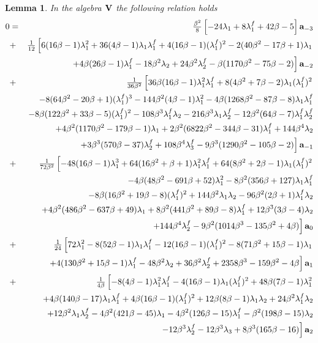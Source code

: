 \documentclass[a4paper]{amsart}
\newtheorem{lemma}{Lemma}[section]
\newcommand{\Vo}{{\bf V}}
\newcommand{\lmu}{\lambda_1}
\newcommand{\lmf}{\lambda_1^f}
\newcommand{\lmd}{\lambda_2}
\newcommand{\lmdf}{\lambda_2^f}
\newcommand{\lmt}{\lambda_3}
\newcommand{\bt}{\beta}
\newcommand{\ba}{{\bf a}}
\begin{document}
\begin{lemma}\label{rel23}
In the algebra $\Vo$ the following relation holds
\begin{eqnarray*}
0&=&\tfrac{\bt^2}{8}\left [-24\lmu+8\lmf+42\bt-5\right ] \ba_{-3} \\
&+&
\tfrac{1}{12}\left [6(16\bt-1)\lmu^2+36(4\bt-1)\lmu\lmf+4(16\bt-1)(\lmf)^2 -2(40\bt^2-17\bt+1)\lmu\right .\\
&& \left . +4\bt(26\bt-1)\lmf-18\bt^2\lmd+24\bt^2\lmdf -\bt(1170\bt^2-75\bt-2) \right ] \ba_{-2} \\
&+& \tfrac{1}{36\bt^2}\left [
36\bt(16\bt-1)\lmu^2\lmf+8(4\bt^2+7\bt-2)\lmu(\lmf)^2 \right . \\
&&-8(64\bt^2-20\bt+1)(\lmf)^3-144\bt^2(4\bt-1)\lmu^2-4\bt(1268\bt^2-87\bt-8)\lmu\lmf \\
&& -8\bt(122\bt^2+33\bt-5)(\lmf)^2-108\bt^3\lmf\lmd-216\bt^3\lmu\lmdf -12\bt^2(64\bt-7)\lmf\lmdf\\
&& +4\bt^2(1170\bt^2-179\bt-1)\lmu +2\bt^2(6822\bt^2-344\bt-31)\lmf +144\bt^4\lmd\\
&&  \left . +3\bt^3(570\bt-37)\lmdf +108\bt^4\lmt^f-9\bt^3(1290\bt^2-105\bt-2)\right ] \ba_{-1} \\
&+& \tfrac{1}{72\bt^2}\left [
-48(16\bt-1)\lmu^3+64(16\bt^2+\bt+1)\lmu^2\lmf+64(8\bt^2+2\bt-1)\lmu(\lmf)^2\right .\\
&& -4\bt(48\bt^2-691\bt+52)\lmu^2-8\bt^2(356\bt+127)\lmu\lmf \\
&& -8\bt(16\bt^2+19\bt-8)(\lmf)^2 
+144\bt^2\lmu\lmd-96\bt^2(2\bt+1)\lmf\lmd \\
&& +4\bt^2(486\bt^2-637\bt+49)\lmu 
 +8\bt^2(441\bt^2+89\bt-8)\lmf+12\bt^3(3\bt-4)\lmd\\
 &&\left .+144\bt^4\lmdf-9\bt^2(1014\bt^3-135\bt^2+4\bt) \right ] \ba_{0} \\
&+& \tfrac{1}{24}\left [
72\lmu^2-8(52\bt-1)\lmu\lmf-12(16\bt-1)(\lmf)^2-8(71\bt^2+15\bt-1)\lmu \right . \\
&&\left .+4(130\bt^2+15\bt-1)\lmf-48\bt^2\lmd+36\bt^2\lmdf+2358\bt^3-159\bt^2-4\bt \right ] \ba_{1} \\
&+& \tfrac{1}{4\bt}\left [
-8(4\bt-1)\lmu^2\lmf-4(16\bt-1)\lmu(\lmf)^2+48\bt(7\bt-1)\lmu^2 \right . \\
&& +4\bt(140\bt-17)\lmu\lmf+4\bt(16\bt-1)(\lmf)^2+12\bt(8\bt-1)\lmu\lmd+24\bt^2\lmf\lmd \\
&& +12\bt^2\lmu\lmdf -4\bt^2(421\bt-45)\lmu-4\bt^2(126\bt-15)\lmf-\bt^2(198\bt-15)\lmd \\
&& \left .-12\bt^3\lmdf-12\bt^3\lmt+8\bt^3(165\bt-16) \right ] \ba_{2} \\

\end{eqnarray*}
\end{lemma}
\end{document}
